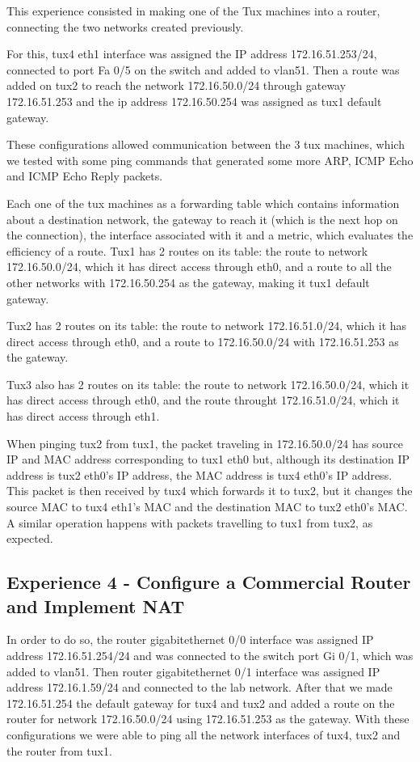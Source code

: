 \documentclass[11pt,a4paper,reqno]{article}
\numberwithin{equation}{section}
\begin{document}
This experience consisted in making one of the Tux machines into a router, connecting the two networks created previously.

For this, tux4 eth1 interface was assigned the IP address 172.16.51.253/24, connected to port Fa 0/5 on the switch and added to vlan51. Then a route was added on tux2 to reach the network 172.16.50.0/24 through gateway 172.16.51.253 and the ip address 172.16.50.254 was assigned as tux1 default gateway.

These configurations allowed communication between the 3 tux machines, which we tested with some ping commands that generated some more ARP,  ICMP Echo and ICMP Echo Reply packets.

Each one of the tux machines as a forwarding table which contains information about a destination network, the gateway to reach it (which is the next hop on the connection), the interface associated with it and a metric, which evaluates the efficiency of a route.
Tux1 has 2 routes on its table: the route to network 172.16.50.0/24, which it has direct access through eth0, and a route to all the other networks with 172.16.50.254 as the gateway, making it tux1 default gateway.

Tux2 has 2 routes on its table: the route to network 172.16.51.0/24, which it has direct access through eth0, and a route to 172.16.50.0/24 with 172.16.51.253 as the gateway.

Tux3 also has 2 routes on its table: the route to network 172.16.50.0/24, which it has direct access through eth0, and the route throught 172.16.51.0/24, which it has direct access through eth1.

When pinging tux2 from tux1, the packet traveling in 172.16.50.0/24 has source IP and MAC address corresponding to tux1 eth0 but, although its destination IP address is tux2 eth0’s IP address, the MAC address is tux4 eth0’s IP address. This packet is then received by tux4 which forwards it to tux2, but it changes the source MAC to tux4 eth1’s MAC and the destination MAC to tux2 eth0’s MAC. A similar operation happens with packets travelling to tux1 from tux2, as expected.

\subsection{Experience 4 - Configure a Commercial Router and Implement NAT}

In order to do so, the router gigabitethernet 0/0 interface was assigned IP address 172.16.51.254/24 and was connected to the switch port Gi 0/1, which was added to vlan51. Then router gigabitethernet 0/1 interface was assigned IP address 172.16.1.59/24 and connected to the lab network. After that we made 172.16.51.254 the default gateway for tux4 and tux2 and added a route on the router for network 172.16.50.0/24 using 172.16.51.253 as the gateway. With these configurations we were able to ping all the network interfaces of tux4, tux2 and the router from tux1.
\end{document}
